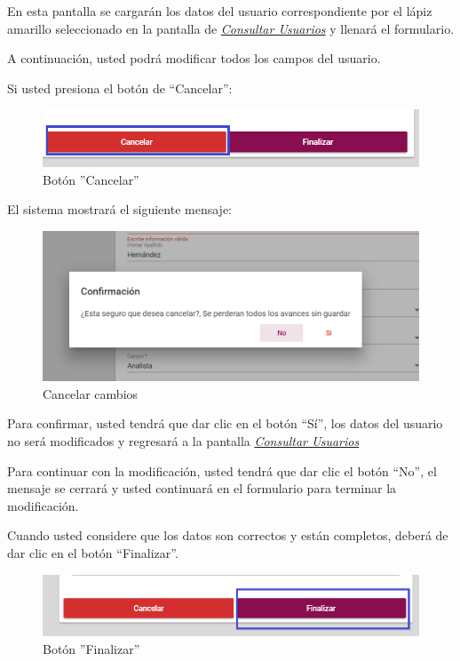                 En esta pantalla se cargarán los datos del usuario correspondiente por el lápiz amarillo seleccionado en la pantalla de \hyperlink{consultarUs}{\textit{Consultar Usuarios}} y llenará el formulario.

                A continuación, usted podrá modificar todos los campos del usuario.

                Si usted presiona el botón de “Cancelar”:

                \begin{figure}[!hbtp]
                    \centering
                    \hypertarget{cancel2}{\includegraphics[width=0.7\linewidth]{images/SP5/BtnCancelar2}}
                    \caption{Botón ''Cancelar''}
                    \label{cancel2}
                \end{figure}

                El sistema mostrará el siguiente mensaje:
                  \clearpage
                 \begin{figure}[!hbtp]
                	\centering
                    \includegraphics[width=0.4\linewidth]{images/SP5/MSG29}
                	\caption{Cancelar cambios}
                	\label{mensaje29}

                \end{figure}

                Para confirmar, usted tendrá que dar clic en el botón “Sí”, los datos del usuario no será modificados  y regresará a la pantalla \hyperlink{consultarUs}{\textit{Consultar Usuarios}}

                Para continuar con la modificación, usted tendrá que  dar clic el botón “No”, el mensaje se cerrará y usted continuará en el formulario para terminar la modificación.

                Cuando usted considere que los datos son correctos y están completos, deberá de dar clic en el botón “Finalizar”.
                \begin{figure}[!hbtp]
                    \centering
                    \hypertarget{btnfin}{\includegraphics[width=0.7\linewidth]{images/SP5/BtnFinalizar}}
                    \caption{Botón ''Finalizar''}
                    \label{btnfin}
                \end{figure}

